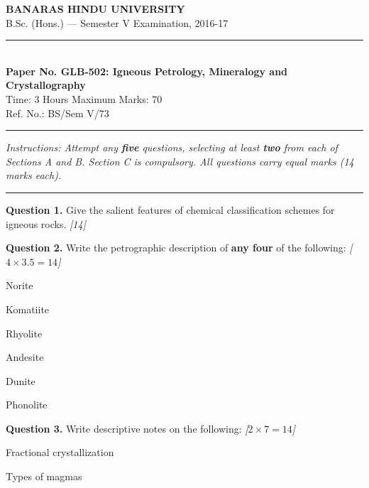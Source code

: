 \documentclass[11pt,a4paper]{article}
\newcommand{\pts}[1]{\hfill   \textit{[#1]}}
\begin{document}
\begin{center}
  {\large\bfseries BANARAS HINDU UNIVERSITY}\\[2pt]
  {\normalsize B.Sc. (Hons.) --- Semester V Examination, 2016-17}\\[6pt]
  \rule{0.8\linewidth}{0.5pt}\\[6pt]
  {\large\bfseries Paper No. GLB-502: Igneous Petrology, Mineralogy and Crystallography}\\[4pt]
  {\normalsize Time: 3 Hours \hfill Maximum Marks: 70}\\[2pt]
  {\small Ref. No.: BS/Sem V/73}
\end{center}
\rule{\linewidth}{0.4pt}
\smallskip



\noindent   \textit{Instructions: Attempt any   \textbf{five} questions, selecting at least   \textbf{two} from each of Sections A and B. Section C is compulsory. All questions carry equal marks (14 marks each).}
\bigskip

\bigskip


\rule{\linewidth}{0.4pt}\smallskip




\noindent   \textbf{Question 1.} Give the salient features of chemical classification schemes for igneous rocks. \pts{14}

\medskip


\noindent   \textbf{Question 2.} Write the petrographic description of   \textbf{any four} of the following: \pts{$4  \times 3.5 = 14$}

\begin{parts}
  \item Norite
  \item Komatiite
  \item Rhyolite
  \item Andesite
  \item Dunite
  \item Phonolite
\end{parts}

\medskip


\noindent   \textbf{Question 3.} Write descriptive notes on the following: \pts{$2  \times 7 = 14$}

\begin{parts}
  \item Fractional crystallization
  \item Types of magmas
\end{parts}
\end{document}

